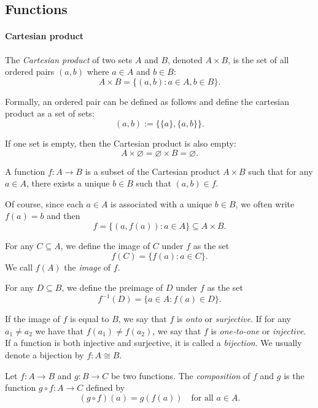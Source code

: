 \subsection{Functions}


\paragraph{Cartesian product}

The \emph{Cartesian product} of two sets $A$ and $B$, denoted $A\times B$, is the set of all ordered pairs \((a,b)\) where \(a\in A\) and \(b\in B\):
\[
A\times B = \{(a,b) : a\in A, b\in B\}.
\]

Formally, an ordered pair can be defined as follows and define the cartesian product as a set of sets:
\[
(a,b) := \{\{a\},\{a,b\}\}.
\]

\begin{remark}
  If one set is empty, then the Cartesian product is also empty:
  \[
  A\times \varnothing = \varnothing \times B = \varnothing.
  \]
\end{remark}

\begin{definition}
  A function \(f\colon A\to B\) is a subset of the Cartesian product \(A\times B\) such that for any \(a\in A\), there exists a unique \(b\in B\) such that \((a,b)\in f\).
\end{definition}

Of course, since each $a\in A$ is associated with a unique $b\in B$, we often write \(f(a) = b\) and then
\[
f = \{(a,f(a)) : a\in A\} \subseteq A\times B.
\]

For any $C\subseteq A$, we define the image of $C$ under $f$ as the set 
\[f(C) = \{f(a) : a\in C\}.\]
We call $f(A)$ the \emph{image} of $f$.

For any $D\subseteq B$, we define the preimage of $D$ under $f$ as the set
\[f^{-1}(D) = \{a\in A : f(a)\in D\}.\]

If the image of $f$ is equal to $B$, we say that $f$ is \emph{onto} or \emph{surjective}.  If for any $a_1\neq a_2$ we have that $f(a_1)\neq f(a_2)$, we say that $f$ is \emph{one‑to‑one} or \emph{injective}.  If a function is both injective and surjective, it is called a \emph{bijection}. We usually denote a bijection by $f:A\cong B$.

Let \(f\colon A\to B\) and \(g\colon B\to C\) be two functions.  The \emph{composition} of \(f\) and \(g\) is the function \(g\circ f\colon A\to C\) defined by
\[
(g\circ f)(a) = g(f(a)) \quad \text{for all } a\in A.
\]

